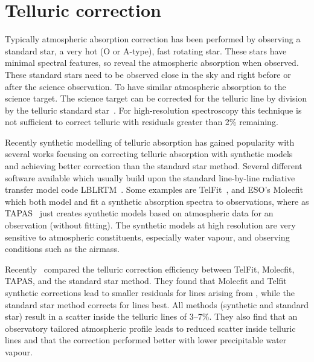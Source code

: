 
\section{Telluric correction}
\label{sec:telluric_correction}

Typically atmospheric absorption correction has been performed by observing a standard star, a very hot (O or A-type), fast rotating star.
These stars have minimal spectral features, so reveal the atmospheric absorption when observed.
These standard stars need to be observed close in the sky and right before or after the science observation.
To have similar atmospheric absorption to the science target.
The science target can be corrected for the telluric line by division by the telluric standard star~\citep[e.g.][]{vacca_method_2003}.
For high-resolution spectroscopy this technique is not sufficient to correct telluric with residuals greater than 2\% remaining.

Recently synthetic modelling of telluric absorption has gained popularity with several works focusing on correcting telluric absorption with synthetic models~\citep[e.g.][]{bailey_correcting_2007, cotton_atmospheric_2014, seifahrt_synthesising_2010} and achieving better correction than the standard star method.
Several different software available which usually build upon the standard line-by-line radiative transfer model code {LBLRTM}~\citep{clough_linebyline_1995}.
Some examples are {TelFit}~\citep{gullikson_correcting_2014}, and ESO's {Molecfit}~\citep{smette_molecfit_2015} which both model and fit a synthetic absorption spectra to observations, where as {TAPAS}~\citep{bertaux_tapas_2014} just creates synthetic models based on atmospheric data for an observation (without fitting).
The synthetic models at high resolution are very sensitive to atmospheric constituents, especially water vapour, and observing conditions such as the airmass.

Recently~\citet{ulmer-moll_telluric_2018} compared the telluric correction efficiency between {TelFit}, {Molecfit}, {TAPAS}, and the standard star method.
They found that {Molecfit} and {Telfit} synthetic corrections lead to smaller residuals for lines arising from , while the standard star method corrects for  lines best.
All methods (synthetic and standard star) result in a scatter inside the telluric lines of 3--7\%.
They also find that an observatory tailored atmospheric profile leads to reduced scatter inside telluric lines and that the correction performed better with lower precipitable water vapour.

